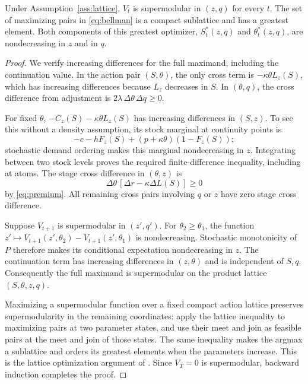 \begin{theorem}\label{thm:lattice}
Under Assumption~\ref{ass:lattice}, $V_t$ is supermodular in $(z,q)$ for every $t$. The set of maximizing pairs in \eqref{eq:bellman} is a compact sublattice and has a greatest element. Both components of this greatest optimizer, $S_t^*(z,q)$ and $\theta_t^*(z,q)$, are nondecreasing in $z$ and in $q$.
\end{theorem}
\begin{proof}
We verify increasing differences for the full maximand, including the continuation value. In the action pair $(S,\theta)$, the only cross term is $-\kappa\theta L_z(S)$, which has increasing differences because $L_z$ decreases in $S$. In $(\theta,q)$, the cross difference from adjustment is $2\lambda\,\Delta\theta\,\Delta q\geq0$.

For fixed $\theta$, $-C_z(S)-\kappa\theta L_z(S)$ has increasing differences in $(S,z)$. To see this without a density assumption, its stock marginal at continuity points is
\[
 -c-hF_z(S)+(p+\kappa\theta)(1-F_z(S));
\]
stochastic demand ordering makes this marginal nondecreasing in $z$. Integrating between two stock levels proves the required finite-difference inequality, including at atoms. The stage cross difference in $(\theta,z)$ is
\[
 \Delta\theta\,[\Delta r-\kappa\Delta L(S)]\geq0
\]
by \eqref{eq:premium}. All remaining cross pairs involving $q$ or $z$ have zero stage cross difference.

Suppose $V_{t+1}$ is supermodular in $(z',q')$. For $\theta_2\geq\theta_1$, the function $z'\mapsto V_{t+1}(z',\theta_2)-V_{t+1}(z',\theta_1)$ is nondecreasing. Stochastic monotonicity of $P$ therefore makes its conditional expectation nondecreasing in $z$. The continuation term has increasing differences in $(z,\theta)$ and is independent of $S,q$. Consequently the full maximand is supermodular on the product lattice $(S,\theta,z,q)$.

Maximizing a supermodular function over a fixed compact action lattice preserves supermodularity in the remaining coordinates: apply the lattice inequality to maximizing pairs at two parameter states, and use their meet and join as feasible pairs at the meet and join of those states. The same inequality makes the argmax a sublattice and orders its greatest elements when the parameters increase. This is the lattice optimization argument of \citet{Topkis1978}. Since $V_T=0$ is supermodular, backward induction completes the proof.\end{proof}

